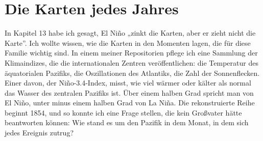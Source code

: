 \documentclass[
  ngerman,
  11pt,
  openany]{book}
\begin{document}
\section{Die Karten jedes Jahres}\label{die-karten-jedes-jahres}

In Kapitel 13 habe ich gesagt, El Niño „zinkt die Karten, aber er zieht
nicht die Karte''. Ich wollte wissen, wie die Karten in den Momenten
lagen, die für diese Familie wichtig sind. In einem meiner Repositorien
pflege ich eine Sammlung der Klimaindizes, die die internationalen
Zentren veröffentlichen: die Temperatur des äquatorialen Pazifiks, die
Oszillationen des Atlantiks, die Zahl der Sonnenflecken. Einer davon,
der Niño-3.4-Index, misst, wie viel wärmer oder kälter als normal das
Wasser des zentralen Pazifiks ist. Über einem halben Grad spricht man
von El Niño, unter minus einem halben Grad von La Niña. Die
rekonstruierte Reihe beginnt 1854, und so konnte ich eine Frage stellen,
die kein Großvater hätte beantworten können: Wie stand es um den Pazifik
in dem Monat, in dem sich jedes Ereignis zutrug?
\end{document}
